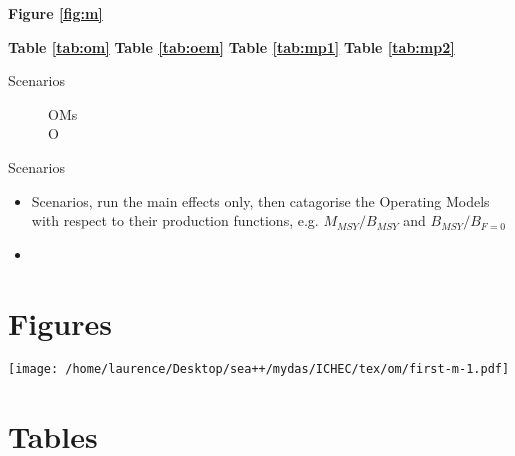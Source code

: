 \documentclass[]{article}
\begin{document}
\textbf{Figure \ref{fig:m}}

\textbf{Table \ref{tab:om}}
\textbf{Table \ref{tab:oem}}
\textbf{Table \ref{tab:mp1}}
\textbf{Table \ref{tab:mp2}}


\begin{description}
 \item[Scenarios]
 \begin{description}
  \item[OMs] 
  \item[O] 
 \end{description}
 \item[Scenarios] 
\end{description}

\begin{itemize}
  \item \relax Scenarios, run the main effects only, then catagorise the Operating Models with respect to their production functions, e.g. $M_{MSY}/B_{MSY}$ and $B_{MSY}/B_{F=0}$
  \item \relax 
\end{itemize}
  





\section*{Figures}


\begin{figure*}[ht]
\begin{center}
\centerline{\texttt{[image: /home/laurence/Desktop/sea++/mydas/ICHEC/tex/om/first-m-1.pdf]}}
\end{center}
\caption{}
\label{fig:m}
\end{figure*}


\section*{Tables}
    
\end{document}
